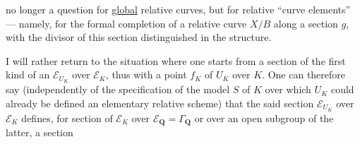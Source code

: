 no longer a question for \uline{global} relative curves, but for relative ``curve elements'' --- namely, for the formal completion of a relative curve $X/B$ along a section $g$, with the divisor of this section distinguished in the structure.

I will rather return to the situation where one starts from a section of the first kind of an $\mathcal E_{U_K}$ over $\mathcal E_K$, thus  with a  point $f_K$ of $U_K$ over $K$. One can therefore say (independently of the specification of the model $S$ of $K$ over which $U_K$ could already be defined  an elementary relative scheme) that the said section  $\mathcal E_{U_K}$ over $\mathcal E_K$  defines, for  section of $\mathcal E_K$ over $\mathcal E_{\mathbf Q}=\Gamma_{\mathbf Q}$ or over an open subgroup  of the latter, a section

